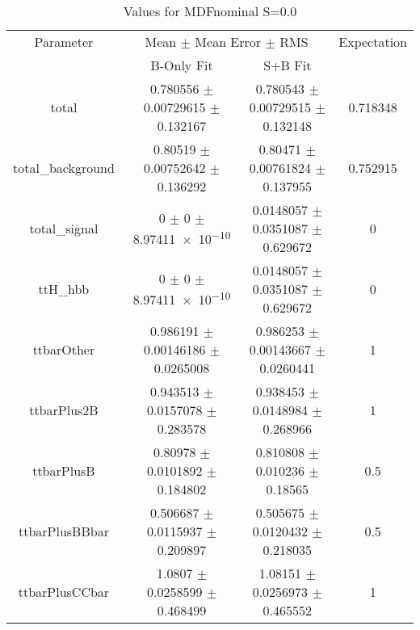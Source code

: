 \begin{table}
\centering
\caption{Values for MDFnominal S=0.0}
\begin{tabular}{cccc}
\toprule
Parameter & \multicolumn{2}{c}{Mean $\pm$ Mean Error $\pm$ RMS} & Expectation\\
 & B-Only Fit & S+B Fit & \\
\midrule
total & \num{0.780556} $\pm$ \num{0.00729615} $\pm$ \num{0.132167} & \num{0.780543} $\pm$ \num{0.00729515} $\pm$ \num{0.132148} & \num{0.718348}\\
total\_background & \num{0.80519} $\pm$ \num{0.00752642} $\pm$ \num{0.136292} & \num{0.80471} $\pm$ \num{0.00761824} $\pm$ \num{0.137955} & \num{0.752915}\\
total\_signal & \num{0} $\pm$ \num{0} $\pm$ \num{8.97411e-10} & \num{0.0148057} $\pm$ \num{0.0351087} $\pm$ \num{0.629672} & \num{0}\\
ttH\_hbb & \num{0} $\pm$ \num{0} $\pm$ \num{8.97411e-10} & \num{0.0148057} $\pm$ \num{0.0351087} $\pm$ \num{0.629672} & \num{0}\\
ttbarOther & \num{0.986191} $\pm$ \num{0.00146186} $\pm$ \num{0.0265008} & \num{0.986253} $\pm$ \num{0.00143667} $\pm$ \num{0.0260441} & \num{1}\\
ttbarPlus2B & \num{0.943513} $\pm$ \num{0.0157078} $\pm$ \num{0.283578} & \num{0.938453} $\pm$ \num{0.0148984} $\pm$ \num{0.268966} & \num{1}\\
ttbarPlusB & \num{0.80978} $\pm$ \num{0.0101892} $\pm$ \num{0.184802} & \num{0.810808} $\pm$ \num{0.010236} $\pm$ \num{0.18565} & \num{0.5}\\
ttbarPlusBBbar & \num{0.506687} $\pm$ \num{0.0115937} $\pm$ \num{0.209897} & \num{0.505675} $\pm$ \num{0.0120432} $\pm$ \num{0.218035} & \num{0.5}\\
ttbarPlusCCbar & \num{1.0807} $\pm$ \num{0.0258599} $\pm$ \num{0.468499} & \num{1.08151} $\pm$ \num{0.0256973} $\pm$ \num{0.465552} & \num{1}\\
\bottomrule
\end{tabular}
\end{table}